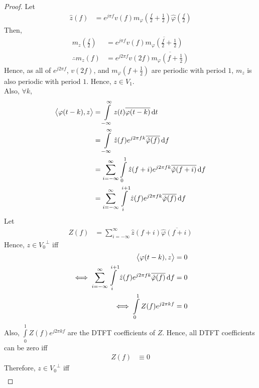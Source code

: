 \documentclass[titlepage, fleqn, a4paper, 12pt, twoside]{article}
\theoremstyle{definition}
\theoremstyle{theorem}
\begin{document}
\begin{proof}
	Let
	\begin{align*}
		\hat{z}(f) &= e^{j \pi f} v(f) m_{\varphi}\left( \frac{f}{2} + \frac{1}{2} \right) \hat{\varphi}\left( \frac{f}{2} \right)
	\end{align*}
	Then,
	\begin{align*}
		m_z\left( \frac{f}{2} \right) &= e^{j \pi f} v(f) \overline{m_{\varphi}\left( \frac{f}{2} + \frac{1}{2} \right)}\\
		\therefore m_z(f) &= e^{j 2 \pi f} v(2 f) \overline{m_{\varphi}\left( f + \frac{1}{2} \right)}
	\end{align*}
	Hence, as all of $e^{j 2 \pi f}$, $v(2 f)$, and $m_{\varphi}\left( f + \frac{1}{2} \right)$ are periodic with period $1$, $m_z$ is also periodic with period $1$.
	Hence, $z \in V_1$.\\
	Also, $\forall k$,
	\begin{align*}
		\left\langle \varphi(t - k) , z \right\rangle &= \int\limits_{-\infty}^{\infty} z(t) \overline{\varphi(t - k)} \dif t\\
		&= \int\limits_{-\infty}^{\infty} \hat{z}(f) e^{j 2 \pi f k} \overline{\hat{\varphi}(f)} \dif f\\
		&= \sum\limits_{i = -\infty}^{\infty} \int\limits_{0}^{1} \hat{z}(f + i) e^{j 2 \pi f k} \overline{\hat{\varphi}(f + i)} \dif f\\
		&= \sum\limits_{i = -\infty}^{\infty} \int\limits_{i}^{i + 1} \hat{z}(f) e^{j 2 \pi f k} \overline{\hat{\varphi}(f)} \dif f
	\end{align*}
	Let
	\begin{align*}
		Z(f) &= \sum\limits_{i = -\infty}^{\infty} \hat{z}(f + i) \overline{\hat{\varphi}(f + i)}
	\end{align*}
	Hence, $z \in {V_0}^{\perp}$ iff
	\begin{align*}
		\left\langle \varphi(t - k) , z \right\rangle &= 0\\
		\iff \sum\limits_{i = -\infty}^{\infty} \int\limits_{i}^{i + 1} \hat{z}(f) e^{j 2 \pi f k} \overline{\hat{\varphi}(f)} \dif f &= 0\\
		\iff \int\limits_{0}^{1} Z(f) e^{j 2 \pi k f} &= 0
	\end{align*}
	Also, $\int\limits_{0}^{1} Z(f) e^{j 2 \pi k f}$ are the DTFT coefficients of $Z$.
	Hence, all DTFT coefficients can be zero iff
	\begin{align*}
		Z(f) &\equiv 0
	\end{align*}
	Therefore, $z \in {V_0}^{\perp}$ iff
	\begin{align*}

\end{align*}
\end{proof}
\end{document}

